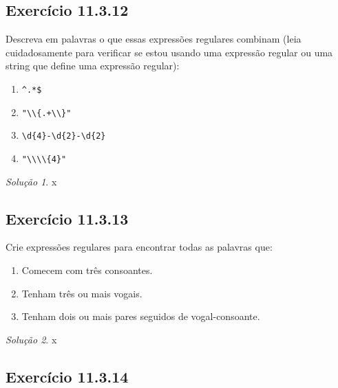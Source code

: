 \documentclass[
]{latex/krantz}
\providecommand{\tightlist}{%
  \setlength{\itemsep}{0pt}\setlength{\parskip}{0pt}}
\theoremstyle{definition}
\theoremstyle{definition}
\theoremstyle{definition}
\theoremstyle{definition}
\theoremstyle{remark}
\newtheorem*{solution}{Solução}
\begin{document}
\hypertarget{exr11-3-12}{%
\subsection*{Exercício 11.3.12}\label{exr11-3-12}}

Descreva em palavras o que essas expressões regulares combinam (leia cuidadosamente para verificar se estou usando uma expressão regular ou uma string que define uma expressão regular):

\begin{enumerate}
\def\labelenumi{\alph{enumi}.}
\tightlist
\item
  \texttt{\^{}.*\$}
\item
  \texttt{"\textbackslash{}\textbackslash{}\{.+\textbackslash{}\textbackslash{}\}"}
\item
  \texttt{\textbackslash{}d\{4\}-\textbackslash{}d\{2\}-\textbackslash{}d\{2\}}
\item
  \texttt{"\textbackslash{}\textbackslash{}\textbackslash{}\textbackslash{}\{4\}"}
\end{enumerate}

\begin{solution}
x
\end{solution}

\hypertarget{exr11-3-13}{%
\subsection*{Exercício 11.3.13}\label{exr11-3-13}}

Crie expressões regulares para encontrar todas as palavras que:

\begin{enumerate}
\def\labelenumi{\alph{enumi}.}
\tightlist
\item
  Comecem com três consoantes.
\item
  Tenham três ou mais vogais.
\item
  Tenham dois ou mais pares seguidos de vogal-consoante.
\end{enumerate}

\begin{solution}
x
\end{solution}

\hypertarget{exr11-3-14}{%
\subsection*{Exercício 11.3.14}\label{exr11-3-14}}
\end{document}
